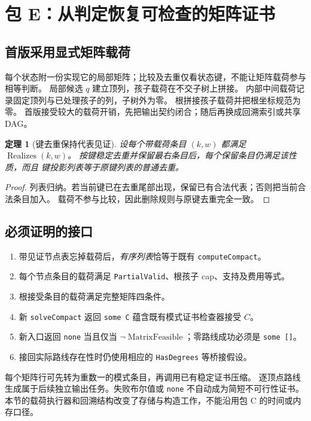 \documentclass[UTF8,a4paper,11pt]{ctexart}
\newtheorem{theorem}{定理}[section]
\theoremstyle{definition}
\newcommand{\MF}{\operatorname{MatrixFeasible}}
\begin{document}
\section{包 E：从判定恢复可检查的矩阵证书}

\subsection{首版采用显式矩阵载荷}
每个状态附一份实现它的局部矩阵；比较及去重仅看状态键，不能让矩阵载荷参与相等判断。
局部候选 $q$ 建立顶列，孩子载荷在不交子树上拼接。
内部中间载荷记录固定顶列与已处理孩子的列，子树外为零。
根拼接孩子载荷并把根坐标规范为零。
首版接受较大的载荷开销，先把输出契约闭合；随后再换成回溯索引或共享 DAG。

\begin{theorem}[键去重保持代表见证]
设每个带载荷条目 $(k,w)$ 都满足 $\operatorname{Realizes}(k,w)$。
按键稳定去重并保留最右条目后，每个保留条目仍满足该性质，而且
键投影列表等于原键列表的普通去重。
\end{theorem}
\begin{proof}
列表归纳。若当前键已在去重尾部出现，保留已有合法代表；否则把当前合法条目加入。
载荷不参与比较，因此删除规则与原键去重完全一致。
\end{proof}

\subsection{必须证明的接口}
\begin{enumerate}
\item 带见证节点表忘掉载荷后，\emph{有序列表}恰等于既有 \texttt{computeCompact}。
\item 每个节点条目的载荷满足 \texttt{PartialValid}、根孩子 cap、支持及费用等式。
\item 根接受条目的载荷满足完整矩阵四条件。
\item 新 \texttt{solveCompact} 返回 \texttt{some C} 蕴含既有模式证书检查器接受 $C$。
\item 新入口返回 \texttt{none} 当且仅当 $\neg\MF$；零路线成功必须是 \texttt{some []}。
\item 接回实际路线存在性时仍使用相应的 \texttt{HasDegrees} 等桥接假设。
\end{enumerate}
每个矩阵行可先转为重数一的模式条目，再调用已有稳定证书压缩。
逐顶点路线生成属于后续独立输出任务。失败布尔值或 \texttt{none} 不自动成为简短不可行性证书。
本节的载荷执行器和回溯结构改变了存储与构造工作，不能沿用包 C 的时间或内存口径。
\end{document}
